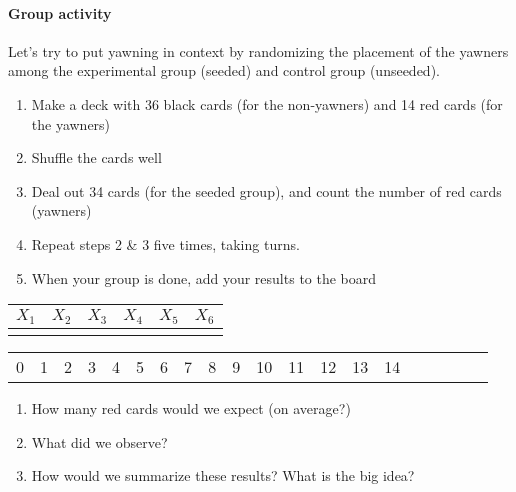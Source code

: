 \documentclass[10pt]{article}\usepackage[]{graphicx}\usepackage[]{color}
\newcommand{\ans}{\vspace{0.25in}}
\begin{document}
\newpage

\paragraph{Group activity} Let's try to put yawning in context by randomizing the placement of the yawners among the experimental group (seeded) and control group (unseeded). 
\begin{enumerate}
  \itemsep0cm
  \item Make a deck with 36 black cards (for the non-yawners) and 14 red cards (for the yawners)
  \item Shuffle the cards well
  \item Deal out 34 cards (for the seeded group), and count the number of red cards (yawners)
  \item Repeat steps 2 \& 3 five times, taking turns.
  \item When your group is done, add your results to the board
\end{enumerate}

\begin{center}
\begin{tabular}{|c|c|c|c|c|c|}
  \hline
  $X_1$ & $X_2$ & $X_3$ & $X_4$ & $X_5$ & $X_6$ \\
  \hline
  \hspace{0.75in} & \hspace{0.75in} & \hspace{0.75in} & \hspace{0.75in} & \hspace{0.75in} & \hspace{0.75in} \\[5ex]
  \hline
\end{tabular}
\end{center}

\vspace{2.5in}

\begin{center}
\begin{tabular}{|c|c|c|c|c|c|c|c|c|c|c|c|c|c|c|c|c|c|c|c|}
  \hline
  0 & 1 & 2 & 3 & 4 & 5 & 6 & 7 & 8 & 9 & 10 & 11 & 12 & 13 & 14 \\
\end{tabular}
\end{center}
% 
\begin{enumerate}
  \itemsep1cm
  \item How many red cards would we expect (on average?)
  \item What did we observe?
  \item How would we summarize these results?   What is the big idea?
  \ans
\end{enumerate}
\end{document}
